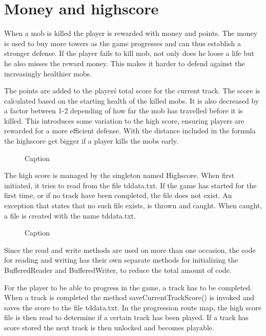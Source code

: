\section{Money and highscore}

When a mob is killed the player is rewarded with money and points. The money is used to buy more towers as the game progresses and can thus establish a stronger defense. If the player fails to kill mob, not only does he loose a life but he also misses the reward money. This makes it harder to defend against the increasingly healthier mobs.

The points are added to the player\'s total score for the current track. The score is calculated based on the starting health of the killed mobs. It is also decreased by a factor between 1-2 depending of how far the mob has travelled before it is killed. This introduces some variation to the high score, ensuring players are rewarded for a more efficient defense. With the distance included in the formula the highscore get bigger if a player kills the mobs early.

\begin{figure}[htb]
\begin{small}

\end{small}
\caption{Caption}
\label{fig:codeExChangeScore}
\end{figure}

The high score is managed by the singleton named Highscore. When first initiated, it tries to read from the file tddata.txt. If the game has started for the first time, or if no track have been completed, the file does not exist. An exception that states that no such file exists, is thrown and caught. When caught, a file is created with the name tddata.txt.

\begin{figure}[htb]
\begin{small}

\end{small}
\caption{Caption}
\label{fig:codeExReadCreateFile}
\end{figure}

Since the read and write methods are used on more than one occasion, the code for reading and writing has their own separate methods for initializing the BufferedReader and BufferedWriter, to reduce the total amount of code.

For the player to be able to progress in the game, a track has to be completed. When a track is completed the method saveCurrentTrackScore() is invoked and saves the score to the file tddata.txt. In the progression route map, the high score file is then read to determine if a certain track has been played. If a track has score stored the next track is then unlocked and becomes playable.